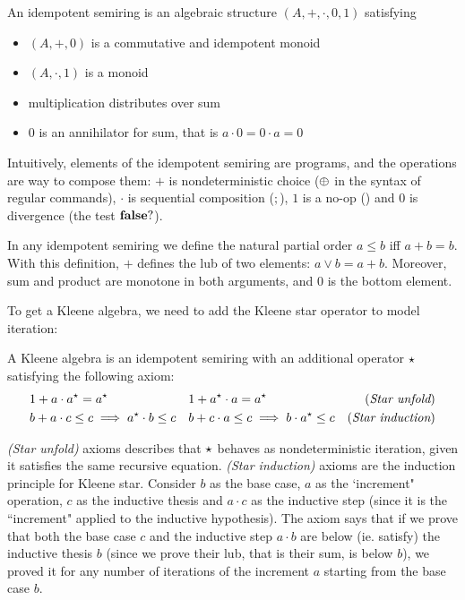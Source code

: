 \begin{definition}\label{def:bg:i-semiring}
	An idempotent semiring is an algebraic structure $(A, +, \cdot, 0, 1)$ satisfying
	\begin{itemize}
		\item $(A, +, 0)$ is a commutative and idempotent monoid
		\item $(A, \cdot, 1)$ is a monoid
		\item multiplication distributes over sum
		\item $0$ is an annihilator for sum, that is $a \cdot 0 = 0 \cdot a = 0$
	\end{itemize}
\end{definition}
Intuitively, elements of the idempotent semiring are programs, and the operations are way to compose them: $+$ is nondeterministic choice ($\oplus$ in the syntax of regular commands), $\cdot$ is sequential composition ($;$), $1$ is a no-op () and $0$ is divergence (the test $\textbf{false} ?$).

In any idempotent semiring we define the natural partial order $a \le b$ iff $a + b = b$. With this definition, $+$ defines the lub of two elements: $a \lor b = a + b$. Moreover, sum and product are monotone in both arguments, and $0$ is the bottom element.

To get a Kleene algebra, we need to add the Kleene star operator to model iteration:
\begin{definition}\label{def:bg:kleene-algebra}
	A Kleene algebra is an idempotent semiring with an additional operator $\star$ satisfying the following axiom:
	\begin{align*}
		 & 1 + a \cdot a^\star = a^\star                     &  & 1 + a^\star \cdot a = a^\star                     & (\textit{Star unfold})    \\
		 & b + a \cdot c \le c \implies a^\star \cdot b \le c &  & b + c \cdot a \le c \implies b \cdot a^\star \le c & (\textit{Star induction})
	\end{align*}
\end{definition}
\textit{(Star unfold)} axioms describes that $\star$ behaves as nondeterministic iteration, given it satisfies the same recursive equation. \textit{(Star induction)} axioms are the induction principle for Kleene star. Consider $b$ as the base case, $a$ as the `increment" operation, $c$ as the inductive thesis and $a \cdot c$ as the inductive step (since it is the ``increment" applied to the inductive hypothesis). The axiom says that if we prove that both the base case $c$ and the inductive step $a \cdot b$ are below (ie. satisfy) the inductive thesis $b$ (since we prove their lub, that is their sum, is below $b$), we proved it for any number of iterations of the increment $a$ starting from the base case $b$.

